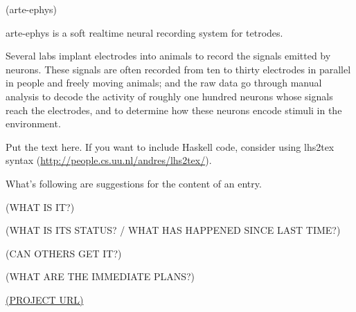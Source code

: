 \documentclass[DIV16,twocolumn,10pt]{scrreprt}
\begin{document}
\begin{hcarentry}{(arte-ephys)}
\makeheader

arte-ephys is a soft realtime neural recording system for tetrodes.  

Several labs implant electrodes into animals to record the signals emitted by neurons.  These signals are often recorded from ten to thirty electrodes in parallel in people and freely moving animals; and the raw data go through manual analysis to decode the activity of roughly one hundred neurons whose signals reach the electrodes, and to determine how these neurons encode stimuli in the environment.



Put the text here. 
If you want to include Haskell code, consider using lhs2tex syntax (\url{http://people.cs.uu.nl/andres/lhs2tex/}).

What's following are suggestions for the content of an entry.

(WHAT IS IT?)

(WHAT IS ITS STATUS? / WHAT HAS HAPPENED SINCE LAST TIME?)

(CAN OTHERS GET IT?)

(WHAT ARE THE IMMEDIATE PLANS?)

\FurtherReading
  \url{(PROJECT URL)}
\end{hcarentry}
\end{document}
